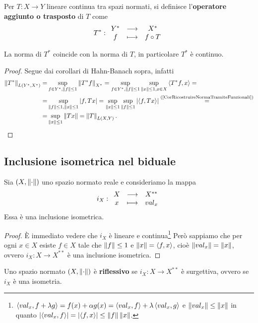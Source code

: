 \begin{definition}
Per $T:X\to Y$ lineare continua tra spazi normati, si definisce l'\textbf{operatore aggiunto o trasposto} di $T$ come
\[T^\ast:\funcDef{Y^\ast}{X^\ast}{f}{f\circ T}\]
\end{definition}

\begin{proposition}
La norma di $T^\ast$ coincide con la norma di $T$, in particolare $T^\ast$ \`e continuo.
\end{proposition}
\begin{proof}
Segue dai corollari di Hahn-Banach sopra, infatti
\begin{align*}
    \norm{T^\ast}_{L(Y^\ast,X^\ast)}=&\sup_{f\in Y^\ast,\norm f\leq 1}\norm{T^\ast f}_{X^\ast}=\sup_{f\in Y^\ast,\norm f\leq 1}\sup_{\norm x\leq 1,x\in X}\ps{T^\ast f,x}=\\
    =&\sup_{\norm f\leq 1,\norm x\leq 1}\abs{f,Tx}=\sup_{\norm x\leq 1}\sup_{\norm f\leq 1}\abs{\ps{f,Tx}}\pasgnl={(\ref{CorRicostruireNormaTramiteFunzionali})}\\
    =&\sup_{\norm x\leq 1}\norm{Tx}=\norm T_{L(X,Y)}.
\end{align*}
\end{proof}


\subsection{Inclusione isometrica nel biduale}
\begin{proposition}\label{PrInclusioneIsometricaNelBiduale}
Sia $(X,\normd)$ uno spazio normato reale e consideriamo la mappa
\[i_X:\funcDef{X}{X^{\ast\ast}}{x}{val_x}\]
Essa \`e una inclusione isometrica.
\end{proposition}
\begin{proof}
\`E immediato vedere che $i_X$ \`e lineare e continua\footnote{$\ps{val_x,f+\la g}=f(x)+\al g(x)=\ps{val_x,f}+\la\ps{val_x,g}$ e $\norm{val_x}\leq \norm x$ in quanto $\abs{\ps{val_x,f}}=\abs{\ps{f,x}}\leq \norm f\norm x$.} Per\`o sappiamo che per ogni $x\in X$ esiste $f\in X$ tale che $\norm f\leq 1$ e $\norm x=\ps{f,x}$, cio\`e $\norm{val_x}=\norm x$, ovvero $i_X:X\to X^{\ast\ast}$ \`e una inclusione isometrica.
\end{proof}

\begin{definition}
Uno spazio normato $(X,\normd)$ \`e \textbf{riflessivo} se $i_X:X\to X^{\ast\ast}$ \`e surgettiva, ovvero se $i_X$ \`e una isometria.
\end{definition}

